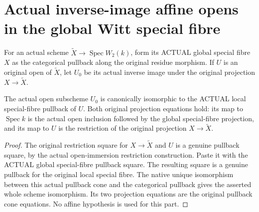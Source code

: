 \section{Actual inverse-image affine opens in the global Witt special fibre}
\label{sec:witt-two-special-fibre-opens}

For an actual scheme $\widetilde X\to\operatorname{Spec}W_2(k)$,
form its ACTUAL global special fibre $X$ as the categorical
pullback along the original residue morphism. If $U$ is an
original open of $\widetilde X$, let $U_0$ be its actual inverse
image under the original projection $X\to\widetilde X$.

\begin{theorem}
\label{thm:witt-two-special-fibre-original-open-iso}
\leanok
The actual open subscheme $U_0$ is canonically isomorphic to the
ACTUAL local special-fibre pullback of $U$. Both original
projection equations hold: its map to $\operatorname{Spec}k$
is the actual open inclusion followed by the global special-fibre
projection, and its map to $U$ is the restriction of the original
projection $X\to\widetilde X$.
\end{theorem}
\begin{proof}
The original restriction square for $X\to\widetilde X$ and $U$
is a genuine pullback square, by the actual open-immersion
restriction construction. Paste it with the ACTUAL global
special-fibre pullback square. The resulting square is a genuine
pullback for the original local special fibre. The native unique
isomorphism between this actual pullback cone and the categorical
pullback gives the asserted whole scheme isomorphism. Its two
projection equations are the original pullback cone equations.
No affine hypothesis is used for this part.
\end{proof}

